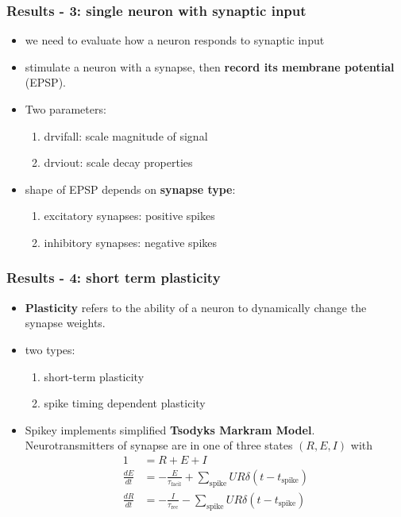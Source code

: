 \documentclass{beamer}
\begin{document}
\begin{frame}
    \frametitle{Results - 3: single neuron with synaptic input}
    \begin{itemize}
    		\item we need to evaluate how a neuron responds to synaptic input
    		\item stimulate a neuron with a synapse,  then \textbf{record its membrane
    		potential} (EPSP).
    		\item Two parameters:
    		\begin{enumerate}
    			\item drvifall: scale magnitude of signal
    			\item drviout: scale decay properties
		\end{enumerate}
		\item shape of EPSP depends on \textbf{synapse type}:
		\begin{enumerate}
			\item excitatory synapses: positive spikes
			\item inhibitory synapses: negative spikes
		\end{enumerate}
    \end{itemize}
\end{frame}

\begin{frame}
    \frametitle{Results - 4: short term plasticity}
    \begin{itemize}
    		\item \textbf{Plasticity} refers to the ability of a neuron to dynamically
    		change the synapse weights.
    		\item two types:
    		\begin{enumerate}
    			\item short-term plasticity
    			\item spike timing dependent plasticity
    		\end{enumerate}
    		\item Spikey implements simplified \textbf{Tsodyks Markram Model}.
    		Neurotransmitters of synapse are in one of three states $(R,E,I)$ with
    		\begin{align}
			1 &= R + E + I  \\
			\frac{dE}{dt} &= - \frac{E}{\tau_\text{facil}} + \sum_\text{spike}
			UR\delta(t-t_\text{spike} ) \\
			\frac{dR}{dt} &= - \frac{I}{\tau_\text{rec}} - \sum_\text{spike}
			UR\delta(t-t_\text{spike} )
\end{align}
    \end{itemize}
\end{frame}
\end{document}
